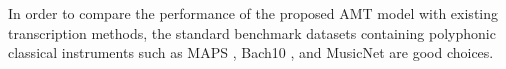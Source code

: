 In order to compare the performance of the proposed AMT model with existing transcription methods, the standard benchmark datasets containing polyphonic classical instruments such as MAPS \cite{emiya2010multipitch}, Bach10 \cite{duan2010bach10}, and MusicNet \cite{thickstun2017musicnet} are good choices.
